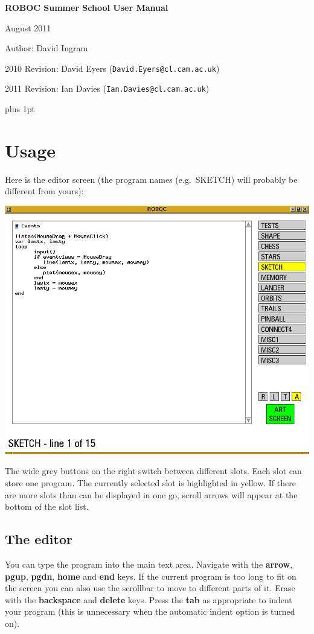 \documentclass[12pt,a4paper,twoside]{article}
\renewcommand{\_}{\texttt{\symbol{95}}}
\begin{document}
\centerline{\textbf{\LARGE ROBOC Summer School User Manual}}
\vspace{0.5cm}
\centerline{August 2011}
\centerline{Author: David Ingram}
\centerline{2010 Revision: David Eyers (\texttt{David.Eyers@cl.cam.ac.uk})}
\centerline{2011 Revision: Ian Davies (\texttt{Ian.Davies@cl.cam.ac.uk})}
{ \parskip 1mm plus 1pt \tableofcontents }

\newpage
\section{Usage}

Here is the editor screen (the program names (e.g.\ SKETCH) will probably be different
from yours):

\begin{center}
\includegraphics[scale=0.6,angle=0]{screenshots/ide/editor}
\end{center}

The wide grey buttons on the right switch between different slots. Each
slot can store one program. The currently selected slot is highlighted
in yellow. If there are more slots than can be
displayed in one go, scroll arrows will appear at the bottom of the
slot list.

\subsection{The editor}

You can type the program into
the main text area. Navigate with the \textbf{arrow}, \textbf{pgup},
\textbf{pgdn}, \textbf{home} and \textbf{end} keys. If the
current program is too long to fit on the screen you can also use the
scrollbar to move to different parts of it.
Erase with the \textbf{backspace} and \textbf{delete} keys.
Press the \textbf{tab} as appropriate
to indent your program (this is unnecessary when the automatic indent
option is
turned on).
\end{document}
